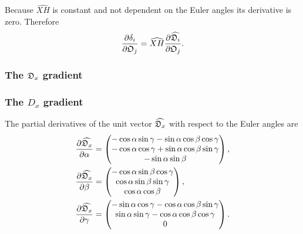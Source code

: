 \noindent Because $\widehat{XH}$ is constant and not dependent on the Euler angles its derivative is zero.  Therefore
\begin{equation}
    \frac{\partial \delta_i}{\partial \mathfrak{O}_j} = \widehat{XH} \frac{\partial \widehat{\mathfrak{D}_i}}{\partial \mathfrak{O}_j}.
\end{equation}



\begin{latexonly}
    \subsubsection{The $\mathfrak{D}_x$ gradient}
\end{latexonly}
\begin{htmlonly}
    \subsubsection{The $D_x$ gradient}
\end{htmlonly}

The partial derivatives of the unit vector $\widehat{\mathfrak{D}_x}$ with respect to the Euler angles are
\begin{subequations}
\begin{align}
    \frac{\partial \widehat{\mathfrak{D}_x}}{\partial \alpha} &= \begin{pmatrix}
        -\cos \alpha \sin \gamma - \sin \alpha \cos \beta \cos \gamma \\
        -\cos \alpha \cos \gamma + \sin \alpha \cos \beta \sin \gamma \\
        -\sin \alpha \sin \beta \\
    \end{pmatrix}, \\
    \frac{\partial \widehat{\mathfrak{D}_x}}{\partial \beta} &= \begin{pmatrix}
        -\cos \alpha \sin \beta \cos \gamma \\
        \cos \alpha \sin \beta \sin \gamma \\
        \cos \alpha \cos \beta \\
    \end{pmatrix}, \\
    \frac{\partial \widehat{\mathfrak{D}_x}}{\partial \gamma} &= \begin{pmatrix}
        -\sin \alpha \cos \gamma - \cos \alpha \cos \beta \sin \gamma \\
        \sin \alpha \sin \gamma - \cos \alpha \cos \beta \cos \gamma \\
        0 \\
    \end{pmatrix}.
\end{align}
\end{subequations}



